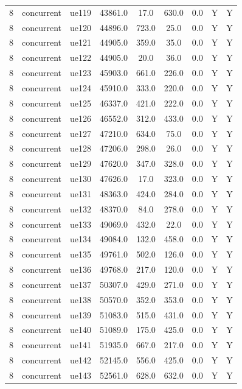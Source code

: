 \begin{table}[ht]
\begin{tabular}{|c|c|c|c|c|c|c|c|c|}
8 & concurrent & ue119 & 43861.0 & 17.0 & 630.0 & 0.0 & Y & Y \\
8 & concurrent & ue120 & 44896.0 & 723.0 & 25.0 & 0.0 & Y & Y \\
8 & concurrent & ue121 & 44905.0 & 359.0 & 35.0 & 0.0 & Y & Y \\
8 & concurrent & ue122 & 44905.0 & 20.0 & 36.0 & 0.0 & Y & Y \\
8 & concurrent & ue123 & 45903.0 & 661.0 & 226.0 & 0.0 & Y & Y \\
8 & concurrent & ue124 & 45910.0 & 333.0 & 220.0 & 0.0 & Y & Y \\
8 & concurrent & ue125 & 46337.0 & 421.0 & 222.0 & 0.0 & Y & Y \\
8 & concurrent & ue126 & 46552.0 & 312.0 & 433.0 & 0.0 & Y & Y \\
8 & concurrent & ue127 & 47210.0 & 634.0 & 75.0 & 0.0 & Y & Y \\
8 & concurrent & ue128 & 47206.0 & 298.0 & 26.0 & 0.0 & Y & Y \\
8 & concurrent & ue129 & 47620.0 & 347.0 & 328.0 & 0.0 & Y & Y \\
8 & concurrent & ue130 & 47626.0 & 17.0 & 323.0 & 0.0 & Y & Y \\
8 & concurrent & ue131 & 48363.0 & 424.0 & 284.0 & 0.0 & Y & Y \\
8 & concurrent & ue132 & 48370.0 & 84.0 & 278.0 & 0.0 & Y & Y \\
8 & concurrent & ue133 & 49069.0 & 432.0 & 22.0 & 0.0 & Y & Y \\
8 & concurrent & ue134 & 49084.0 & 132.0 & 458.0 & 0.0 & Y & Y \\
8 & concurrent & ue135 & 49761.0 & 502.0 & 126.0 & 0.0 & Y & Y \\
8 & concurrent & ue136 & 49768.0 & 217.0 & 120.0 & 0.0 & Y & Y \\
8 & concurrent & ue137 & 50307.0 & 429.0 & 271.0 & 0.0 & Y & Y \\
8 & concurrent & ue138 & 50570.0 & 352.0 & 353.0 & 0.0 & Y & Y \\
8 & concurrent & ue139 & 51083.0 & 515.0 & 431.0 & 0.0 & Y & Y \\
8 & concurrent & ue140 & 51089.0 & 175.0 & 425.0 & 0.0 & Y & Y \\
8 & concurrent & ue141 & 51935.0 & 667.0 & 217.0 & 0.0 & Y & Y \\
8 & concurrent & ue142 & 52145.0 & 556.0 & 425.0 & 0.0 & Y & Y \\
8 & concurrent & ue143 & 52561.0 & 628.0 & 632.0 & 0.0 & Y & Y \\

\end{tabular}
\end{table}
